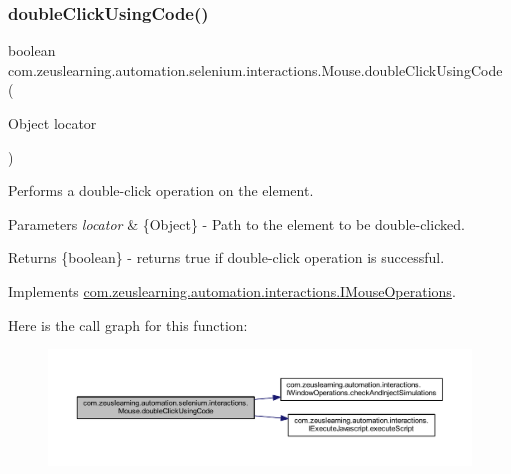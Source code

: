 \subsubsection{\texorpdfstring{double\+Click\+Using\+Code()}{doubleClickUsingCode()}}
{\footnotesize\ttfamily boolean com.\+zeuslearning.\+automation.\+selenium.\+interactions.\+Mouse.\+double\+Click\+Using\+Code (\begin{DoxyParamCaption}\item[{Object}]{locator }\end{DoxyParamCaption})\hspace{0.3cm}{\ttfamily [inline]}}

Performs a double-\/click operation on the element.


\begin{DoxyParams}{Parameters}
{\em locator} & \{Object\} -\/ Path to the element to be double-\/clicked.\\
\hline
\end{DoxyParams}
\begin{DoxyReturn}{Returns}
\{boolean\} -\/ returns {\ttfamily true} if double-\/click operation is successful. 
\end{DoxyReturn}


Implements \hyperlink{interfacecom_1_1zeuslearning_1_1automation_1_1interactions_1_1IMouseOperations_a928202fe444c43e446a21baf312d40d9}{com.\+zeuslearning.\+automation.\+interactions.\+I\+Mouse\+Operations}.

Here is the call graph for this function\+:
\nopagebreak
\begin{figure}[H]
\begin{center}
\leavevmode
\includegraphics[width=350pt]{d0/dfa/classcom_1_1zeuslearning_1_1automation_1_1selenium_1_1interactions_1_1Mouse_a4d718e201b6eb171a4016ea46e5f538b_cgraph}
\end{center}
\end{figure}
\hypertarget{classcom_1_1zeuslearning_1_1automation_1_1selenium_1_1interactions_1_1Mouse_a083f651ca67fec159c6992f44019164b}{}\label{classcom_1_1zeuslearning_1_1automation_1_1selenium_1_1interactions_1_1Mouse_a083f651ca67fec159c6992f44019164b} 
